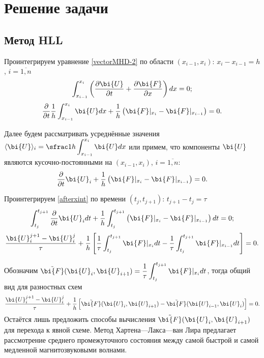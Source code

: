 \documentclass[12pt, a4paper]{article}
\begin{document}
 	\section{Решение задачи}
 	\subsection{Метод HLL}
 	
 	Проинтегрируем уравнение  \eqref{vectorMHD-2} по области $(x_{i-1},x_{i})$: $x_{i}-x_{i-1}=h$, $i=\overline{1,n}$%
 	\[
 		\displaystyle \int_{x_{i-1}}^{x_i} \left(\dfrac{\partial \bi{U}}{\partial t}+\dfrac{\partial \bi{F}}{\partial x}\right)dx = 0;
 	\]
 	\[
 		\dfrac{\partial }{\partial t}\dfrac1h\displaystyle \int_{x_{i-1}}^{x_i} \bi{U}dx +
 		 \dfrac1h \left(\bi{F}|_{x_i}-\bi{F}|_{x_{i-1}}\right)= 0.
 	\]
 	
 	Далее будем рассматривать усреднённые значения $\langle\bi{U}\rangle_i = \sfrac1h \displaystyle\int_{x_{i-1}}^{x_i}\bi{U}dx$ или примем, что компоненты $\bi{U}$ являются кусочно-постоянными на $(x_{i-1},x_{i})$, $i=\overline{1,n}$: 
 	\begin{equation}
 		\label{afterxint}
 		\dfrac{\partial }{\partial t}\displaystyle \bi{U}_i +
 	\dfrac1h \left(\bi{F}|_{x_i}-\bi{F}|_{x_{i-1}}\right)= 0.
 	\end{equation}
 
 	Проинтегрируем \eqref{afterxint} по времени $(t_j,t_{j+1})$: $t_{j+1}-t_{j}=\tau$
 	\[
 	\displaystyle\int_{t_j}^{t_{j+1}}\dfrac{\partial }{\partial t}\bi{U}_i dt +  \dfrac1h	\displaystyle\int_{t_j}^{t_{j+1}}\left(\bi{F}|_{x_i}-\bi{F}|_{x_{i-1}}\right)dt = 0; 
 	\]
 	\[
 	\dfrac{\bi{U}^{j+1}_i-\bi{U}^{j}_i}{\tau} + \dfrac1h \left[
 	\dfrac1\tau \displaystyle\int_{t_j}^{t_{j+1}}\bi{F}|_{x_i}dt - \dfrac1\tau \displaystyle\int_{t_j}^{t_{j+1}}\bi{F}|_{x_{i-1}}dt
 	\right]=0.
 	\]
 	
 	Обозначим $\tilde{\bi{F}}(\bi{U}_i,\bi{U}_{i+1}) = \dfrac1\tau \displaystyle\int_{t_j}^{t_{j+1}}\bi{F}|_{x_i}dt$, тогда общий вид для разностных схем
 	\[
 	\dfrac{\bi{U}^{j+1}_i-\bi{U}^{j}_i}{\tau} + \dfrac1h \left[\tilde{\bi{F}}(\bi{U}_i,\bi{U}_{i+1}) -\tilde{\bi{F}}(\bi{U}_{i-1},\bi{U}_{i})\right]=0.
 	\]
 Остаётся лишь предложить способы вычисления  $\tilde{\bi{F}}(\bi{U}_i,\bi{U}_{i+1})$ для перехода к явной схеме. Метод Хартена---Лакса---ван Лира предлагает рассмотрение среднего промежуточного состояния между самой быстрой и самой медленной магнитозвуковыми волнами. %
 
\end{document}
